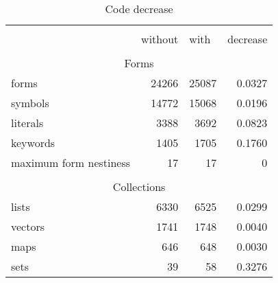 \clearpage


\begin{table}[]
\centering
\caption{Code decrease}
\label{}
\begin{tabular}{lrrr}
                                                   & \multicolumn{1}{l}{}         & \multicolumn{1}{l}{}       & \multicolumn{1}{l}{}          \\ \cline{2-4}
\multicolumn{1}{l|}{}                              & \multicolumn{1}{l|}{without} & \multicolumn{1}{l|}{with}  & \multicolumn{1}{l|}{decrease} \\ \cline{2-4}


                                                   & \multicolumn{1}{l}{}         & \multicolumn{1}{l}{}       & \multicolumn{1}{l}{}          \\
\multicolumn{4}{c}{Forms}                                                                                                                      \\ \hline
\multicolumn{1}{|l|}{forms}                        & \multicolumn{1}{r|}{24266}   & \multicolumn{1}{r|}{25087} & \multicolumn{1}{r|}{0.0327}   \\ \hline
\multicolumn{1}{|l|}{symbols}                      & \multicolumn{1}{r|}{14772}   & \multicolumn{1}{r|}{15068} & \multicolumn{1}{r|}{0.0196}   \\ \hline
\multicolumn{1}{|l|}{literals}                     & \multicolumn{1}{r|}{3388}    & \multicolumn{1}{r|}{3692}  & \multicolumn{1}{r|}{0.0823}   \\ \hline
\multicolumn{1}{|l|}{keywords}                     & \multicolumn{1}{r|}{1405}    & \multicolumn{1}{r|}{1705}  & \multicolumn{1}{r|}{0.1760}    \\ \hline
\multicolumn{1}{|l|}{maximum form nestiness}       & \multicolumn{1}{r|}{17}      & \multicolumn{1}{r|}{17}    & \multicolumn{1}{r|}{0}        \\ \hline

                                                   & \multicolumn{1}{l}{}         & \multicolumn{1}{l}{}       & \multicolumn{1}{l}{}          \\
\multicolumn{4}{c}{Collections}                                                                                                                \\ \hline
\multicolumn{1}{|l|}{lists}                        & \multicolumn{1}{r|}{6330}    & \multicolumn{1}{r|}{6525}  & \multicolumn{1}{r|}{0.0299}   \\ \hline
\multicolumn{1}{|l|}{vectors}                      & \multicolumn{1}{r|}{1741}    & \multicolumn{1}{r|}{1748}  & \multicolumn{1}{r|}{0.0040}    \\ \hline
\multicolumn{1}{|l|}{maps}                         & \multicolumn{1}{r|}{646}     & \multicolumn{1}{r|}{648}   & \multicolumn{1}{r|}{0.0030}    \\ \hline
\multicolumn{1}{|l|}{sets}                         & \multicolumn{1}{r|}{39}      & \multicolumn{1}{r|}{58}    & \multicolumn{1}{r|}{0.3276}   \\ \hline



\end{tabular}
\end{table}
